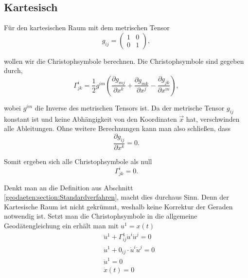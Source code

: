 %
%
%
%
\subsection{Kartesisch\label{geodaeten:section:Standardverfahren:Kartesisch}}

Für den kartesischen Raum mit dem metrischen Tensor 
\begin{equation}
g_{ij} = \begin{pmatrix} 
	1 & 0 \\ 
	0 & 1 
\end{pmatrix},
\end{equation}

wollen wir die Christophsymbole berechnen.
Die Christophsymbole sind gegeben durch,
\begin{equation}
\Gamma^i_{jk} = \frac{1}{2} g^{im} \left( \frac{\partial g_{mj}}{\partial x^k} + \frac{\partial g_{mk}}{\partial x^j} - \frac{\partial g_{jk}}{\partial x^m} \right),
\end{equation}

wobei $g^{im}$ die Inverse des metrischen Tensors ist.
Da der metrische Tensor $g_{ij}$ konstant ist und keine Abhängigkeit von den Koordinaten $\vec{x}$ hat, verschwinden alle Ableitungen.
Ohne weitere Berechnungen kann man also schließen, dass
\begin{equation}
\frac{\partial g_{ij}}{\partial x^k} = 0 .
\end{equation}

Somit ergeben sich alle Christophsymbole als null
\begin{equation}
\Gamma^i_{jk} = 0 .
\end{equation}

Denkt man an die Definition aus Abschnitt \ref{geodaeten:section:Standardverfahren}, macht dies durchaus Sinn.
Denn der Kartesische Raum ist nicht gekrümmt, weshalb keine Korrektur der Geraden notwendig ist.
Setzt man die Christophsymbole in die allgemeine Geodätengleichung ein erhält man mit $u^1 = x(t)$
\begin{equation}
\begin{aligned}
&\ddot{u}^1 + \Gamma_{ij}^1 \dot{u}^i \dot{u}^j = 0 \\
&\ddot{u}^1 + 0_{ij} \cdot \dot{u}^i \dot{u}^j = 0\\
&\ddot{u}^1 = 0 \\
&\ddot{x}(t) = 0
\end{aligned}
\label{geodaeten:equation:Standardverfahren:Kartesisch:x}
\end{equation}

